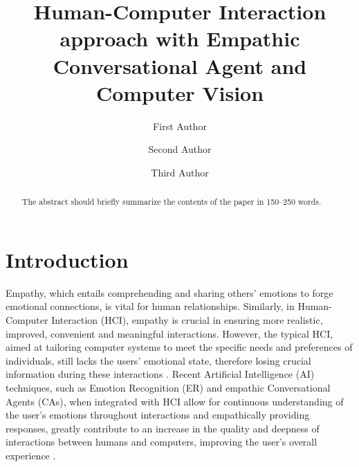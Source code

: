 \documentclass[runningheads]{llncs}
\begin{document}
%
\title{Human-Computer Interaction approach with Empathic Conversational Agent and Computer Vision}
%
%
\author{First Author \and
Second Author \and
Third Author}
%
%
%
\maketitle              %
%
\begin{abstract}
The abstract should briefly summarize the contents of the paper in
150--250 words.

\end{abstract}
%
%
%

\section{Introduction}

Empathy, which entails comprehending and sharing others' emotions to forge emotional connections, is vital for human relationships. Similarly, in Human-Computer Interaction (HCI), empathy is crucial in ensuring more realistic, improved, convenient and meaningful interactions. However, the typical HCI, aimed at tailoring computer systems to meet the specific needs and preferences of individuals, still lacks the users' emotional state, therefore losing crucial information during these interactions \cite{jaiswal_facial_2020}.  Recent Artificial Intelligence (AI) techniques, such as Emotion Recognition (ER) and empathic Conversational Agents (CAs), when integrated with HCI allow for continuous understanding of the user's emotions throughout interactions and empathically providing responses, greatly contribute to an increase in the quality and deepness of interactions between humans and computers, improving the user's overall experience \cite{santos_approaches_2018}.
\end{document}
